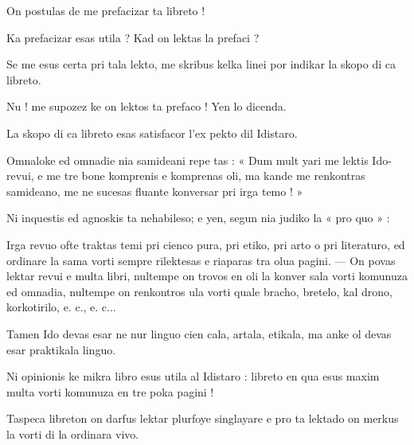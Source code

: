 \begin{VUpage}[5]{}
\VUsaut{3.0mm}
\VUsaut{2.0mm}
\VUfilet{14.5mm}
\VUsaut{6.0mm}

On postulas de me prefacizar ta libreto !

\VUblancAlinea
Ka prefacizar esas utila ? Kad on lektas la\nl
prefaci ?

\VUblancAlinea
Se me esus certa pri tala lekto, me skribus\nl
kelka linei por indikar la skopo di ca libreto.

\VUblancAlinea
Nu ! me supozez ke on lektos ta prefaco ! Yen\nl
lo dicenda.

\VUblancAlinea
La skopo di ca libreto esas satisfacor l'ex\cc
pekto dil Idistaro.

\VUblancAlinea
Omnaloke ed omnadie nia samideani repe\cc
tas : « Dum mult yari me lektis Ido-revui, e me\nl
tre bone komprenis e komprenas oli, ma kande\nl
me renkontras samideano, me ne sucesas\nl
fluante konversar pri irga temo ! »

\VUblancAlinea
Ni inquestis ed agnoskis ta nehabileso; e\nl
yen, segun nia judiko la « pro quo » :

\VUblancAlinea
Irga revuo ofte traktas temi pri cienco pura,\nl
pri etiko, pri arto o pri literaturo, ed ordinare\nl
la sama vorti sempre rilektesas e riaparas tra\nl
olua pagini. --- On povas lektar revui e multa\nl
libri, nultempe on trovos en oli la konver\cc
sala vorti komunuza ed omnadia, nultempe on\nl
renkontros ula vorti quale bracho, bretelo, kal\cc
drono, korkotirilo, e. c., e. c...

\VUblancAlinea
Tamen Ido devas esar ne nur linguo cien\cc
cala, artala, etikala, ma anke ol devas esar\nl
praktikala linguo.

\VUblancAlinea
Ni opinionis ke mikra libro esus utila al\nl
Idistaro : libreto en qua esus maxim multa\nl
vorti komunuza en tre poka pagini !

\VUblancAlinea
Taspeca libreton on darfus lektar plurfoye\nl
singlayare e pro ta lektado on merkus la vorti\nl
di la ordinara vivo.
\end{VUpage}

